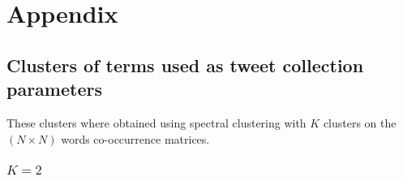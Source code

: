 \setcounter{secnumdepth}{-1}
\chapter{Appendix}

\section{Clusters of terms used as tweet collection parameters}
\label{Appendix: Clusters}

These clusters where obtained using spectral clustering with $K$ clusters on the $(N \times N) $ words co-occurrence matrices.

\subsection*{$K=2$}

